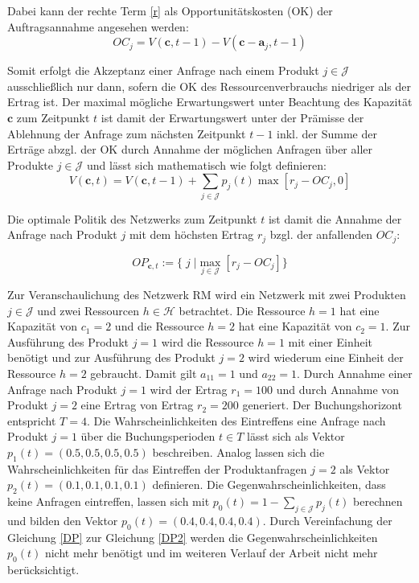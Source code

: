 Dabei kann der rechte Term \eqref{r} als Opportunitätskosten (OK) der Auftragsannahme angesehen werden:
\begin{equation}\label{OC}
OC_{j} = V(\textbf{c},t-1)-V(\textbf{c}-\textbf{a}_{j},t-1)
\end{equation}

Somit erfolgt die Akzeptanz einer Anfrage nach einem Produkt $j\in\mathcal{J}$ ausschließlich nur dann, sofern die OK des Ressourcenverbrauchs niedriger als der Ertrag ist. Der maximal mögliche Erwartungswert unter Beachtung des Kapazität $\textbf{c}$ zum Zeitpunkt $t$ ist damit der Erwartungswert unter der Prämisse der Ablehnung der Anfrage zum nächsten Zeitpunkt $t-1$ inkl. der Summe der Erträge abzgl. der OK durch Annahme der möglichen Anfragen über aller Produkte $j\in\mathcal{J}$ und lässt sich mathematisch wie folgt definieren:
\begin{equation}\label{DPoc}
V(\textbf{c},t)=V(\textbf{c},t-1) + \sum_{j\in\mathcal{J}}p_{j}(t) \max[r_{j}-OC_{j},0]
\end{equation}

Die optimale Politik des Netzwerks zum Zeitpunkt $t$ ist damit die Annahme der Anfrage nach Produkt $j$ mit dem höchsten Ertrag $r_{j}$ bzgl. der anfallenden $OC_{j}$:

\begin{equation}\label{OP}
OP_{\textbf{c}, t}:= \{ \; j\; | \max_{j\in\mathcal{J}} [r_{j}-OC_{j}] \} 
\end{equation}

Zur Veranschaulichung des Netzwerk RM wird ein Netzwerk mit zwei Produkten $j\in\mathcal{J}$ und zwei Ressourcen $h\in\mathcal{H}$ betrachtet. Die Ressource $h=1$ hat eine Kapazität von $c_{1}=2$ und die Ressource $h=2$ hat eine Kapazität von $c_{2}=1$. Zur Ausführung des Produkt $j=1$ wird die Ressource $h=1$ mit einer Einheit benötigt und zur Ausführung des Produkt $j=2$ wird wiederum eine Einheit der Ressource $h=2$ gebraucht. Damit gilt $a_{11}=1$ und $a_{22}=1$. Durch Annahme einer Anfrage nach Produkt $j=1$ wird der Ertrag $r_{1}=100$ und durch Annahme von Produkt $j=2$ eine Ertrag von Ertrag $r_{2}=200$ generiert. Der Buchungshorizont entspricht $T=4$. Die Wahrscheinlichkeiten des Eintreffens eine Anfrage nach Produkt $j=1$ über die Buchungsperioden $t\in T$ lässt sich als Vektor $p_{1}(t)=(0.5, 0.5, 0.5, 0.5)$ beschreiben. Analog lassen sich die Wahrscheinlichkeiten für das Eintreffen der Produktanfragen $j=2$ als Vektor $p_{2}(t)=(0.1, 0.1, 0.1, 0.1)$ definieren. Die Gegenwahrscheinlichkeiten, dass keine Anfragen eintreffen, lassen sich mit $p_{0}(t)=1-\sum_{j\in \mathcal{J}}p_{j}(t)$ berechnen und bilden den Vektor $p_{0}(t)=(0.4, 0.4, 0.4, 0.4)$. Durch Vereinfachung der Gleichung \eqref{DP} zur Gleichung \eqref{DP2} werden die Gegenwahrscheinlichkeiten $p_{0}(t)$ nicht mehr benötigt und im weiteren Verlauf der Arbeit nicht mehr berücksichtigt.

